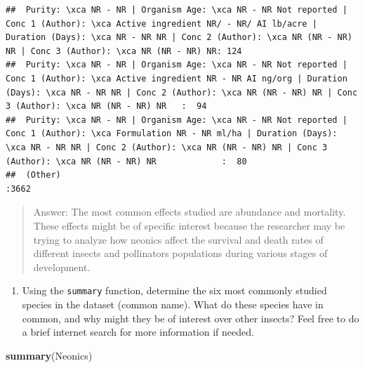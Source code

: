 \documentclass[]{article}
\newenvironment{Shaded}{\begin{snugshade}}{\end{snugshade}}
\newcommand{\KeywordTok}[1]{\textcolor[rgb]{0.13,0.29,0.53}{\textbf{#1}}}
\newcommand{\NormalTok}[1]{#1}
\providecommand{\tightlist}{%
  \setlength{\itemsep}{0pt}\setlength{\parskip}{0pt}}
\begin{document}
\begin{verbatim}
##  Purity: \xca NR - NR | Organism Age: \xca NR - NR Not reported | Conc 1 (Author): \xca Active ingredient NR/ - NR/ AI lb/acre | Duration (Days): \xca NR - NR NR | Conc 2 (Author): \xca NR (NR - NR) NR | Conc 3 (Author): \xca NR (NR - NR) NR: 124  
##  Purity: \xca NR - NR | Organism Age: \xca NR - NR Not reported | Conc 1 (Author): \xca Active ingredient NR - NR AI ng/org | Duration (Days): \xca NR - NR NR | Conc 2 (Author): \xca NR (NR - NR) NR | Conc 3 (Author): \xca NR (NR - NR) NR   :  94  
##  Purity: \xca NR - NR | Organism Age: \xca NR - NR Not reported | Conc 1 (Author): \xca Formulation NR - NR ml/ha | Duration (Days): \xca NR - NR NR | Conc 2 (Author): \xca NR (NR - NR) NR | Conc 3 (Author): \xca NR (NR - NR) NR             :  80  
##  (Other)                                                                                                                                                                                                                                         :3662
\end{verbatim}

\begin{quote}
Answer: The most common effects studied are abundance and mortality.
These effects might be of specific interest because the researcher may
be trying to analyze how neonics affect the survival and death rates of
different insects and pollinators populations during various stages of
development.
\end{quote}

\begin{enumerate}
\def\labelenumi{\arabic{enumi}.}
\setcounter{enumi}{6}
\tightlist
\item
  Using the \texttt{summary} function, determine the six most commonly
  studied species in the dataset (common name). What do these species
  have in common, and why might they be of interest over other insects?
  Feel free to do a brief internet search for more information if
  needed.
\end{enumerate}

\begin{Shaded}
\begin{Highlighting}[]
\KeywordTok{summary}\NormalTok{(Neonics)}
\end{Highlighting}
\end{Shaded}
\end{document}
